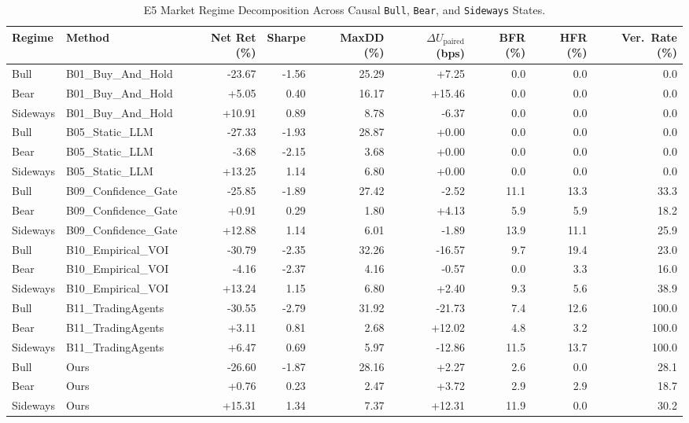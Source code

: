 \begin{table}[t]
\centering
\caption{E5 Market Regime Decomposition Across Causal \texttt{Bull}, \texttt{Bear}, and \texttt{Sideways} States.}
\label{tab:e5_market_regimes}
\footnotesize
\begin{tabular}{llrrrrrrr}
\toprule
Regime & Method & Net Ret (\%) & Sharpe & MaxDD (\%) & $\Delta U_{\text{paired}}$ (bps) & BFR (\%) & HFR (\%) & Ver.\ Rate (\%) \\
\midrule
Bull & B01\_Buy\_And\_Hold & -23.67 & -1.56 & 25.29 & +7.25 & 0.0 & 0.0 & 0.0 \\
Bear & B01\_Buy\_And\_Hold & +5.05 & 0.40 & 16.17 & +15.46 & 0.0 & 0.0 & 0.0 \\
Sideways & B01\_Buy\_And\_Hold & +10.91 & 0.89 & 8.78 & -6.37 & 0.0 & 0.0 & 0.0 \\
Bull & B05\_Static\_LLM & -27.33 & -1.93 & 28.87 & +0.00 & 0.0 & 0.0 & 0.0 \\
Bear & B05\_Static\_LLM & -3.68 & -2.15 & 3.68 & +0.00 & 0.0 & 0.0 & 0.0 \\
Sideways & B05\_Static\_LLM & +13.25 & 1.14 & 6.80 & +0.00 & 0.0 & 0.0 & 0.0 \\
Bull & B09\_Confidence\_Gate & -25.85 & -1.89 & 27.42 & -2.52 & 11.1 & 13.3 & 33.3 \\
Bear & B09\_Confidence\_Gate & +0.91 & 0.29 & 1.80 & +4.13 & 5.9 & 5.9 & 18.2 \\
Sideways & B09\_Confidence\_Gate & +12.88 & 1.14 & 6.01 & -1.89 & 13.9 & 11.1 & 25.9 \\
Bull & B10\_Empirical\_VOI & -30.79 & -2.35 & 32.26 & -16.57 & 9.7 & 19.4 & 23.0 \\
Bear & B10\_Empirical\_VOI & -4.16 & -2.37 & 4.16 & -0.57 & 0.0 & 3.3 & 16.0 \\
Sideways & B10\_Empirical\_VOI & +13.24 & 1.15 & 6.80 & +2.40 & 9.3 & 5.6 & 38.9 \\
Bull & B11\_TradingAgents & -30.55 & -2.79 & 31.92 & -21.73 & 7.4 & 12.6 & 100.0 \\
Bear & B11\_TradingAgents & +3.11 & 0.81 & 2.68 & +12.02 & 4.8 & 3.2 & 100.0 \\
Sideways & B11\_TradingAgents & +6.47 & 0.69 & 5.97 & -12.86 & 11.5 & 13.7 & 100.0 \\
Bull & Ours & -26.60 & -1.87 & 28.16 & +2.27 & 2.6 & 0.0 & 28.1 \\
Bear & Ours & +0.76 & 0.23 & 2.47 & +3.72 & 2.9 & 2.9 & 18.7 \\
Sideways & Ours & +15.31 & 1.34 & 7.37 & +12.31 & 11.9 & 0.0 & 30.2 \\
\bottomrule
\end{tabular}
\end{table}
